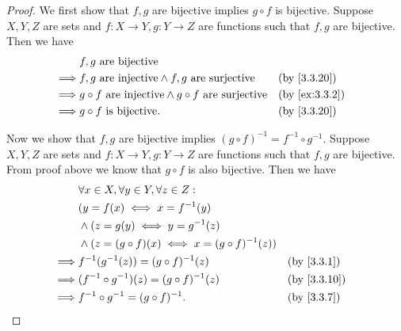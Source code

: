 \begin{proof}
  We first show that \(f, g\) are bijective implies \(g \circ f\) is bijective.
  Suppose \(X, Y, Z\) are sets and \(f : X \to Y, g : Y \to Z\) are functions such that \(f, g\) are bijective.
  Then we have
  \begin{align*}
             & f, g \text{ are bijective}                                                                              \\
    \implies & f, g \text{ are injective} \land f, g \text{ are surjective}           &  & \text{(by \cref{3.3.20})}   \\
    \implies & g \circ f \text{ are injective} \land g \circ f \text{ are surjective} &  & \text{(by \cref{ex:3.3.2})} \\
    \implies & g \circ f \text{ is bijective}.                                        &  & \text{(by \cref{3.3.20})}
  \end{align*}

  Now we show that \(f, g\) are bijective implies \((g \circ f)^{-1} = f^{-1} \circ g^{-1}\).
  Suppose \(X, Y, Z\) are sets and \(f : X \to Y, g : Y \to Z\) are functions such that \(f, g\) are bijective.
  From proof above we know that \(g \circ f\) is also bijective.
  Then we have
  \begin{align*}
             & \forall x \in X, \forall y \in Y, \forall z \in Z :                                    \\
             & (y = f(x) \iff x = f^{-1}(y)                                                           \\
             & \land (z = g(y) \iff y = g^{-1}(z)                                                     \\
             & \land (z = (g \circ f)(x) \iff x = (g \circ f)^{-1}(z))                                \\
    \implies & f^{-1}(g^{-1}(z)) = (g \circ f)^{-1}(z)                 &  & \by{3.3.1}                \\
    \implies & (f^{-1} \circ g^{-1})(z) = (g \circ f)^{-1}(z)          &  & \text{(by \cref{3.3.10})} \\
    \implies & f^{-1} \circ g^{-1} = (g \circ f)^{-1}.                 &  & \by{3.3.7}
  \end{align*}
\end{proof}

